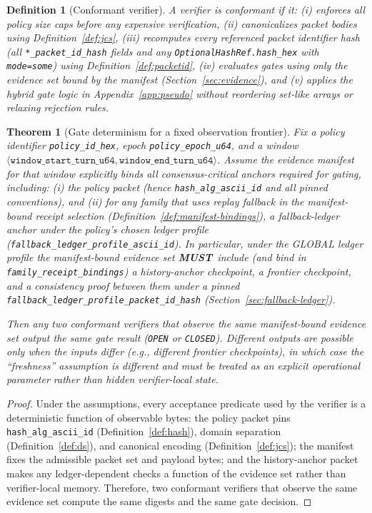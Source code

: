 \documentclass[11pt]{article}
\newcommand{\MUST}{\textbf{MUST}}
\newtheorem{definition}{Definition}
\newtheorem{theorem}{Theorem}
\begin{document}
\begin{definition}[Conformant verifier]\label{def:conformant}
A verifier is \emph{conformant} if it:
(i) enforces all policy size caps before any expensive verification,
(ii) canonicalizes packet bodies using Definition~\ref{def:jcs},
(iii) recomputes every referenced packet identifier hash (all \texttt{*\_packet\_id\_hash} fields and any \texttt{OptionalHashRef.hash\_hex} with \texttt{mode=some}) using Definition~\ref{def:packetid},
(iv) evaluates gates using only the evidence set bound by the manifest (Section~\ref{sec:evidence}),
and (v) applies the hybrid gate logic in Appendix~\ref{app:pseudo} without reordering set-like arrays or relaxing rejection rules.
\end{definition}

\begin{theorem}[Gate determinism for a fixed observation frontier]\label{thm:determinism}
Fix a policy identifier \texttt{policy\_id\_hex}, epoch \texttt{policy\_epoch\_u64}, and a window $\langle \texttt{window\_start\_turn\_u64},\texttt{window\_end\_turn\_u64}\rangle$.
Assume the evidence manifest for that window \emph{explicitly binds} all consensus-critical anchors required for gating, including:
(i) the policy packet (hence \texttt{hash\_alg\_ascii\_id} and all pinned conventions), and
(ii) for any family that uses replay fallback in the manifest-bound receipt selection (Definition~\ref{def:manifest-bindings}), a fallback-ledger anchor under the policy's chosen ledger profile (\texttt{fallback\_ledger\_profile\_ascii\_id}).
In particular, under the GLOBAL ledger profile the manifest-bound evidence set \MUST\ include (and bind in \texttt{family\_receipt\_bindings}) a history-anchor checkpoint, a frontier checkpoint, and a consistency proof between them under a pinned \texttt{fallback\_ledger\_profile\_packet\_id\_hash} (Section~\ref{sec:fallback-ledger}).

Then any two conformant verifiers that observe the same manifest-bound evidence set output the same gate result (\texttt{OPEN} or \texttt{CLOSED}).
Different outputs are possible only when the inputs differ (e.g., different frontier checkpoints), in which case the ``freshness'' assumption is different and must be treated as an explicit operational parameter rather than hidden verifier-local state.
\end{theorem}

\begin{proof}
Under the assumptions, every acceptance predicate used by the verifier is a deterministic function of observable bytes:
the policy packet pins \texttt{hash\_alg\_ascii\_id} (Definition~\ref{def:hash}), domain separation (Definition~\ref{def:ds}), and canonical encoding (Definition~\ref{def:jcs});
the manifest fixes the admissible packet set and payload bytes; and the history-anchor packet makes any ledger-dependent checks a function of the evidence set rather than verifier-local memory.
Therefore, two conformant verifiers that observe the same evidence set compute the same digests and the same gate decision.
\end{proof}
\end{document}
